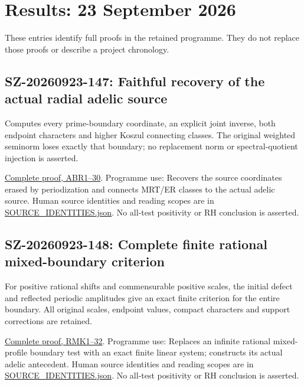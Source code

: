 \documentclass[
]{article}
\author{}
\date{}
\begin{document}
\section{Results: 23 September 2026}\label{results-23-september-2026}

These entries identify full proofs in the retained programme. They do
not replace those proofs or describe a project chronology.

\subsection{SZ-20260923-147: Faithful recovery of the actual radial
adelic
source}\label{sz-20260923-147-faithful-recovery-of-the-actual-radial-adelic-source}

Computes every prime-boundary coordinate, an explicit joint inverse,
both endpoint characters and higher Koszul connecting classes. The
original weighted seminorm loses exactly that boundary; no replacement
norm or spectral-quotient injection is asserted.

\href{https://github.com/KokunoYumeto/zeta-function-research-reader/blob/main/workbenches/splitzero-tandem/continuations/20260923-retained-source-readers/adelic-boundary-recovery/sources/independent/CC_ADELIC_COINVARIANT_BRIDGE_INDEPENDENT.tex\#L35}{Complete
proof, ABR1--30}. Programme use: Recovers the source coordinates erased
by periodization and connects MRT/ER classes to the actual adelic
source. Human source identities and reading scopes are in
\href{https://github.com/KokunoYumeto/zeta-function-research-reader/blob/main/workbenches/splitzero-tandem/continuations/20260923-retained-source-readers/adelic-boundary-recovery/sources/SOURCE_IDENTITIES.json}{SOURCE\_IDENTITIES.json}.
No all-test positivity or RH conclusion is asserted.

\subsection{SZ-20260923-148: Complete finite rational mixed-boundary
criterion}\label{sz-20260923-148-complete-finite-rational-mixed-boundary-criterion}

For positive rational shifts and commensurable positive scales, the
initial defect and reflected periodic amplitudes give an exact finite
criterion for the entire boundary. All original scales, endpoint values,
compact characters and support corrections are retained.

\href{https://github.com/KokunoYumeto/zeta-function-research-reader/blob/main/workbenches/splitzero-tandem/continuations/20260923-retained-source-readers/adelic-boundary-recovery/sources/independent/RATIONAL_MIXED_BOUNDARY_KERNEL.tex\#L34}{Complete
proof, RMK1--32}. Programme use: Replaces an infinite rational
mixed-profile boundary test with an exact finite linear system;
constructs its actual adelic antecedent. Human source identities and
reading scopes are in
\href{https://github.com/KokunoYumeto/zeta-function-research-reader/blob/main/workbenches/splitzero-tandem/continuations/20260923-retained-source-readers/adelic-boundary-recovery/sources/SOURCE_IDENTITIES.json}{SOURCE\_IDENTITIES.json}.
No all-test positivity or RH conclusion is asserted.
\end{document}
